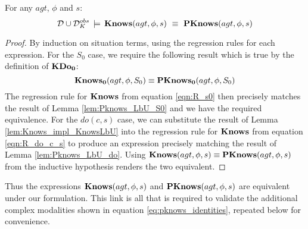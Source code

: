 \begin{thm}
For any $agt$, $\phi$ and $s$:\[
\mathcal{D}\cup\mathcal{D}_{K}^{obs}\,\models\,\mathbf{Knows}(agt,\phi,s)\,\,\equiv\,\,\mathbf{PKnows}(agt,\phi,s)\]

\end{thm}
\begin{proof}
By induction on situation terms, using the regression rules for each
expression. For the $S_{0}$ case, we require the following result
which is true by the definition of $\mathbf{KDo_{0}}$:\[
\mathbf{Knows_{0}}(agt,\phi,S_{0})\equiv\mathbf{PKnows_{0}}(agt,\phi,S_{0})\]
 The regression rule for $\mathbf{Knows}$ from equation \eqref{eqn:R_s0}
then precisely matches the result of Lemma \ref{lem:Pknows_LbU_S0}
and we have the required equivalence. For the $do(c,s)$ case, we
can substitute the result of Lemma \ref{lem:Knows_impl_KnowsLbU}
into the regression rule for $\mathbf{Knows}$ from equation \eqref{eqn:R_do_c_s}
to produce an expression precisely matching the result of Lemma \ref{lem:Pknows_LbU_do}.
Using $\mathbf{Knows}(agt,\phi,s)\equiv\mathbf{PKnows}(agt,\phi,s)$ from the inductive
hypothesis renders the two equivalent. 
\end{proof}
Thus the expressions $\mathbf{Knows}(agt,\phi,s)$ and $\mathbf{PKnows}(agt,\phi,s)$
are equivalent under our formulation. This link is all that is required
to validate the additional complex modalities shown in equation \eqref{eq:pknows_identities},
repeated below for convenience.


